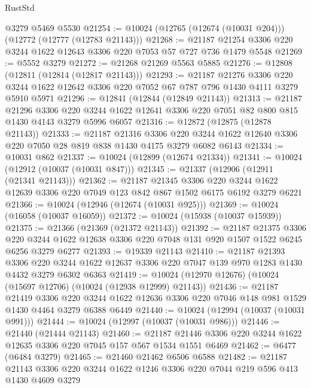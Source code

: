 \begin{lexlean}{RustStd}
\begin{coremodule}
    @3279
    @5469
    @5530
@21254 := @10024 (@12765 (@12674 (@10031 @204))) (@12772 (@12777 (@12783 @21143)))
@21268 := @21187 @21254 @3306 @220 @3244 @1622 @12643 @3306 @220 @7053 @57 @727 @736 @1479 @5548
@21269 := @5552 @3279
@21272 := @21268 @21269 @5563 @5885
@21276 := @12808 (@12811 (@12814 (@12817 @21143)))
@21293 := @21187
    @21276
    @3306
    @220
    @3244
    @1622
    @12642
    @3306
    @220
    @7052
    @67
    @787
    @796
    @1430
    @4111
    @3279
    @5910
    @5971
@21296 := @12841 (@12844 (@12849 @21143))
@21313 := @21187
    @21296
    @3306
    @220
    @3244
    @1622
    @12641
    @3306
    @220
    @7051
    @82
    @800
    @815
    @1430
    @4143
    @3279
    @5996
    @6057
@21316 := @12872 (@12875 (@12878 @21143))
@21333 := @21187
    @21316
    @3306
    @220
    @3244
    @1622
    @12640
    @3306
    @220
    @7050
    @28
    @819
    @838
    @1430
    @4175
    @3279
    @6082
    @6143
@21334 := @10031 @862
@21337 := @10024 (@12899 (@12674 @21334))
@21341 := @10024 (@12912 (@10037 (@10031 @847)))
@21345 := @21337 (@12906 (@12911 (@21341 @21143)))
@21362 := @21187
    @21345
    @3306
    @220
    @3244
    @1622
    @12639
    @3306
    @220
    @7049
    @123
    @842
    @867
    @1502
    @6175
    @6192
    @3279
    @6221
@21366 := @10024 (@12946 (@12674 (@10031 @925)))
@21369 := @10024 (@16058 (@10037 @16059))
@21372 := @10024 (@15938 (@10037 @15939))
@21375 := @21366 (@21369 (@21372 @21143))
@21392 := @21187
    @21375
    @3306
    @220
    @3244
    @1622
    @12638
    @3306
    @220
    @7048
    @131
    @920
    @1507
    @1522
    @6245
    @6256
    @3279
    @6277
@21393 := @19339 @21143
@21410 := @21187
    @21393
    @3306
    @220
    @3244
    @1622
    @12637
    @3306
    @220
    @7047
    @139
    @970
    @1283
    @1430
    @4432
    @3279
    @6302
    @6363
@21419 := @10024 (@12970 @12676) (@10024 (@15697 @12706) (@10024 (@12938 @12999) @21143))
@21436 := @21187
    @21419
    @3306
    @220
    @3244
    @1622
    @12636
    @3306
    @220
    @7046
    @148
    @981
    @1529
    @1430
    @4464
    @3279
    @6388
    @6449
@21440 := @10024 (@12994 (@10037 (@10031 @991)))
@21444 := @10024 (@12997 (@10037 (@10031 @986)))
@21446 := @21440 (@21444 @21143)
@21460 := @21187 @21446 @3306 @220 @3244 @1622 @12635 @3306 @220 @7045 @157 @567 @1534 @1551 @6469
@21462 := @6477 (@6484 @3279)
@21465 := @21460 @21462 @6506 @6588
@21482 := @21187
    @21143
    @3306
    @220
    @3244
    @1622
    @1246
    @3306
    @220
    @7044
    @219
    @596
    @413
    @1430
    @4609
    @3279

\end{coremodule}
\end{lexlean}
